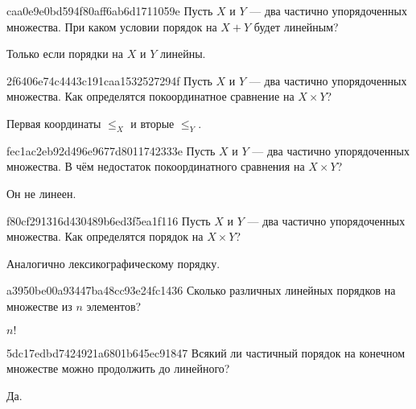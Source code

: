 \begin{note}{caa0e9e0bd594f80aff6ab6d1711059e}
    Пусть \({ X }\) и \({ Y }\) --- два частично упорядоченных множества.
    При каком условии порядок на \({ X + Y }\) будет линейным?

    \begin{cloze}{1}
        Только если порядки на \({ X }\) и \({ Y }\) линейны.
    \end{cloze}
\end{note}

\begin{note}{2f6406e74c4443c191caa1532527294f}
    Пусть \({ X }\) и \({ Y }\) --- два частично упорядоченных множества.
    Как определятся покоординатное сравнение на \({ X \times Y }\)?

    \begin{cloze}{1}
        Первая координаты \({ \leqslant_{X} }\) и вторые \({ \leqslant_{Y} }\).
    \end{cloze}
\end{note}

\begin{note}{fec1ac2eb92d496e9677d8011742333e}
    Пусть \({ X }\) и \({ Y }\) --- два частично упорядоченных множества.
    В чём недостаток покоординатного сравнения на \({ X \times Y }\)?

    \begin{cloze}{1}
        Он не линеен.
    \end{cloze}
\end{note}

\begin{note}{f80cf291316d430489b6ed3f5ea1f116}
    Пусть \({ X }\) и \({ Y }\) --- два частично упорядоченных множества.
    Как определятся порядок на \({ X \times Y }\)?

    \begin{cloze}{1}
        Аналогично лексикографическому порядку.
    \end{cloze}
\end{note}

\begin{note}{a3950be00a93447ba48cc93e24fc1436}
    Сколько различных линейных порядков на множестве из \({ n }\) элементов?

    \begin{cloze}{1}
        \({ n! }\)
    \end{cloze}
\end{note}

\begin{note}{5dc17edbd7424921a6801b645ec91847}
    Всякий ли частичный порядок на конечном множестве можно продолжить до линейного?

    \begin{cloze}{1}
        Да.
    \end{cloze}
\end{note}

